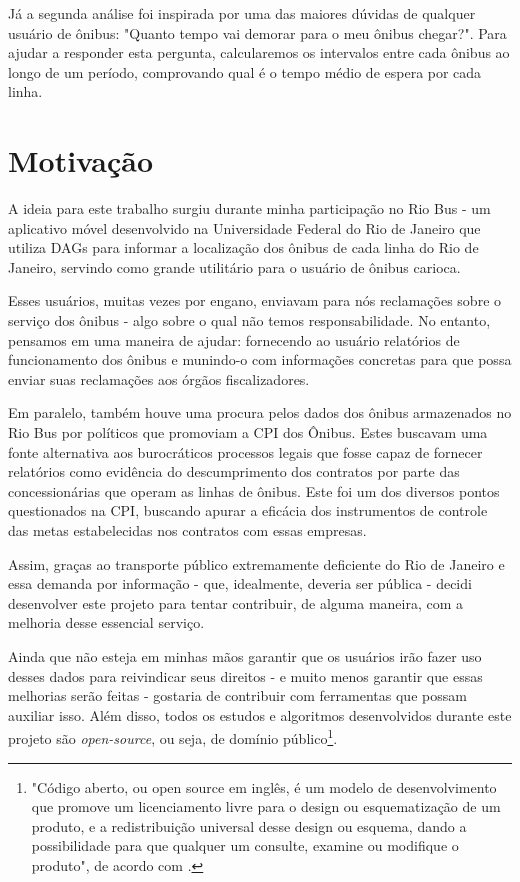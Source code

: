 Já a segunda análise foi inspirada por uma das maiores dúvidas de qualquer usuário de ônibus: "Quanto tempo vai demorar para o meu ônibus chegar?". Para ajudar a responder esta pergunta, calcularemos os intervalos entre cada ônibus ao longo de um período, comprovando qual é o tempo médio de espera por cada linha. 



\section{Motivação}\label{sec:CAP_INTRO_MOTIVACAO}

A ideia para este trabalho surgiu durante minha participação no Rio Bus\cite{riobus_sc} - um aplicativo móvel desenvolvido na Universidade Federal do Rio de Janeiro que utiliza DAGs para informar a localização dos ônibus de cada linha do Rio de Janeiro, servindo como grande utilitário para o usuário de ônibus carioca.

Esses usuários, muitas vezes por engano, enviavam para nós reclamações sobre o serviço dos ônibus - algo sobre o qual não temos responsabilidade. No entanto, pensamos em uma maneira de ajudar: fornecendo ao usuário relatórios de funcionamento dos ônibus e munindo-o com informações concretas para que possa enviar suas reclamações aos órgãos fiscalizadores.

Em paralelo, também houve uma procura pelos dados dos ônibus armazenados no Rio Bus por políticos que promoviam a CPI dos Ônibus\cite{cpi_dos_onibus}. Estes buscavam uma fonte alternativa aos burocráticos processos legais que fosse capaz de fornecer relatórios como evidência do descumprimento dos contratos por parte das concessionárias que operam as linhas de ônibus. Este foi um dos diversos pontos questionados na CPI, buscando apurar a eficácia dos instrumentos de controle das metas estabelecidas nos contratos com essas empresas.

Assim, graças ao transporte público extremamente deficiente do Rio de Janeiro e essa demanda por informação - que, idealmente, deveria ser pública - decidi desenvolver este projeto para tentar contribuir, de alguma maneira, com a melhoria desse essencial serviço. 

Ainda que não esteja em minhas mãos garantir que os usuários irão fazer uso desses dados para reivindicar seus direitos - e muito menos garantir que essas melhorias serão feitas - gostaria de contribuir com ferramentas que possam auxiliar isso. Além disso, todos os estudos e algoritmos desenvolvidos durante este projeto são \textit{open-source}, ou seja, de domínio público\footnote{"Código aberto, ou open source em inglês, é um modelo de desenvolvimento que promove um licenciamento livre para o design ou esquematização de um produto, e a redistribuição universal desse design ou esquema, dando a possibilidade para que qualquer um consulte, examine ou modifique o produto", de acordo com \cite{REF_OPEN_SOURCE}.}.


